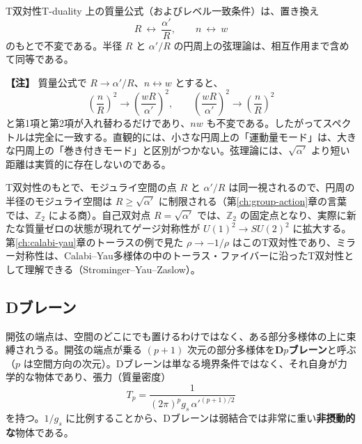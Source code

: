 \documentclass[uplatex, dvipdfmx, book]{jsbook}
\let\origsubsection\subsection
\let\origsubsubsection\subsubsection
\renewcommand{\section}{\origsubsection}
\renewcommand{\subsection}{\origsubsubsection}
\renewcommand{\subsubsection}{\paragraph}
\newenvironment{note}{\vspace{1ex}\par\footnotesize\noindent\textbf{【注】}}{\par\vspace{1ex}}
\begin{document}
\begin{myprop}{T双対性}{T-duality}
上の質量公式（およびレベル一致条件）は、置き換え
\begin{equation*}
    R \ \longleftrightarrow\ \frac{\alpha'}{R}, \qquad n \ \longleftrightarrow\ w
\end{equation*}
のもとで不変である。半径 $R$ と $\alpha'/R$ の円周上の弦理論は、相互作用まで含めて同等である。
\end{myprop}

\begin{note}
質量公式で $R \to \alpha'/R$、$n \leftrightarrow w$ とすると、
\begin{equation*}
    \left( \frac{n}{R} \right)^2 \to \left( \frac{wR}{\alpha'} \right)^2, \qquad \left( \frac{wR}{\alpha'} \right)^2 \to \left( \frac{n}{R} \right)^2
\end{equation*}
と第1項と第2項が入れ替わるだけであり、$nw$ も不変である。したがってスペクトルは完全に一致する。直観的には、小さな円周上の「運動量モード」は、大きな円周上の「巻き付きモード」と区別がつかない。弦理論には、$\sqrt{\alpha'}$ より短い距離は実質的に存在しないのである。
\end{note}

T双対性のもとで、モジュライ空間の点 $R$ と $\alpha'/R$ は同一視されるので、円周の半径のモジュライ空間は $R \ge \sqrt{\alpha'}$ に制限される（第\ref{ch:group-action}章の言葉では、$\mathbb{Z}_2$ による商）。自己双対点 $R = \sqrt{\alpha'}$ では、$\mathbb{Z}_2$ の固定点となり、実際に新たな質量ゼロの状態が現れてゲージ対称性が $U(1)^2 \to SU(2)^2$ に拡大する。第\ref{ch:calabi-yau}章のトーラスの例で見た $\rho \to -1/\rho$ はこのT双対性であり、ミラー対称性は、Calabi--Yau多様体の中のトーラス・ファイバーに沿ったT双対性として理解できる（Strominger--Yau--Zaslow）。

\section{Dブレーン}

開弦の端点は、空間のどこにでも置けるわけではなく、ある部分多様体の上に束縛されうる。開弦の端点が乗る $(p+1)$ 次元の部分多様体を\textbf{D$p$ブレーン}と呼ぶ（$p$ は空間方向の次元）。Dブレーンは単なる境界条件ではなく、それ自身が力学的な物体であり、張力（質量密度）
\begin{equation}
    T_p = \frac{1}{(2\pi)^p g_s\, \alpha'^{(p+1)/2}}
\end{equation}
を持つ。$1/g_s$ に比例することから、Dブレーンは弱結合では非常に重い\textbf{非摂動的な}物体である。
\end{document}
